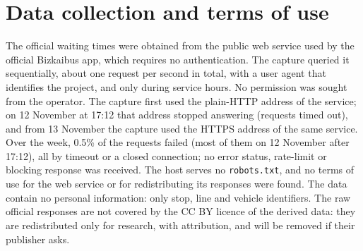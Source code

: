 \section*{Data collection and terms of use}

The official waiting times were obtained from the public web service used by the official Bizkaibus app, which requires
no authentication. The capture queried it sequentially, about one request per second in total, with a user agent that
identifies the project, and only during service hours. No permission was sought from the operator. The capture first used the plain-HTTP address of the service; on 12
November at 17:12 that address stopped answering (requests timed out), and from 13 November the capture used the HTTPS
address of the same service. Over the week, 0.5\% of the requests failed (most of them on 12 November after 17:12), all by timeout or a closed
connection; no
error status, rate-limit or blocking response was received. The host serves no \texttt{robots.txt}, and no terms of use
for the web service or for redistributing its responses were found. The data contain no
personal information: only stop, line and vehicle identifiers. The raw official responses are not covered by the CC BY licence of the derived data: they are redistributed only for
research, with attribution, and will be removed if their publisher asks.
